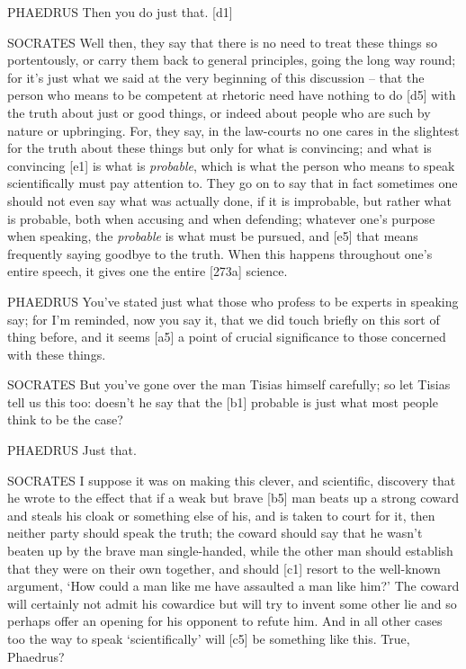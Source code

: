 PHAEDRUS Then you do just that. {[}d1{]}

SOCRATES Well then, they say that there is no need to treat these things
so portentously, or carry them back to general principles, going the
long way round; for it's just what we said at the very beginning of this
discussion -- that the person who means to be competent at rhetoric need
have nothing to do {[}d5{]} with the truth about just or good things, or
indeed about people who are such by nature or upbringing. For, they say,
in the law-courts no one cares in the slightest for the truth about
these things but only for what is convincing; and what is convincing
{[}e1{]} is what is {\em probable}, which is what the person who means
to speak scientifically must pay attention to. They go on to say that in
fact sometimes one should not even say what was actually done, if it is
improbable, but rather what is probable, both when accusing and when
defending; whatever one's purpose when speaking, the {\em probable} is
what must be pursued, and {[}e5{]} that means frequently saying goodbye
to the truth. When this happens throughout one's entire speech, it gives
one the entire {[}273a{]} science.

PHAEDRUS You've stated just what those who profess to be experts in
speaking say; for I'm reminded, now you say it, that we did touch
briefly on this sort of thing before, and it seems {[}a5{]} a point of
crucial significance to those concerned with these things.

SOCRATES But you've gone over the man Tisias himself carefully; so let
Tisias tell us this too: doesn't he say that the {[}b1{]} probable is
just what most people think to be the case?

PHAEDRUS Just that.

SOCRATES I suppose it was on making this clever, and scientific,
discovery that he wrote to the effect that if a weak but brave {[}b5{]}
man beats up a strong coward and steals his cloak or something else of
his, and is taken to court for it, then neither party should speak the
truth; the coward should say that he wasn't beaten up by the brave man
single-handed, while the other man should establish that they were on
their own together, and should {[}c1{]} resort to the well-known
argument, ‘How could a man like me have assaulted a man like him?' The
coward will certainly not admit his cowardice but will try to invent
some other lie and so perhaps offer an opening for his opponent to
refute him. And in all other cases too the way to speak ‘scientifically'
will {[}c5{]} be something like this. True, Phaedrus?

